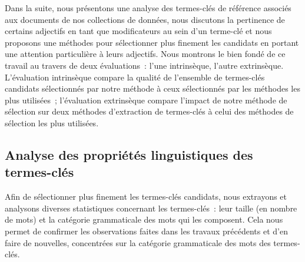     Dans la suite, nous présentons une analyse des termes-clés de référence
    associés aux documents de nos collections de données, nous discutons la
    pertinence de certains adjectifs en tant que modificateurs au sein d'un
    terme-clé et nous proposons une méthodes pour sélectionner plus finement les
    candidats en portant une attention particulière à leurs adjectifs. Nous
    montrons le bien fondé de ce travail au travers de deux évaluations~: l'une
    intrinsèque, l'autre extrinsèque. L'évaluation intrinsèque compare la
    qualité de l'ensemble de termes-clés candidats sélectionnés par notre
    méthode à ceux sélectionnés par les méthodes les plus utilisées~;
    l'évaluation extrinsèque compare l'impact de notre méthode de sélection sur
    deux méthodes d'extraction de termes-clés à celui des méthodes de sélection
    les plus utilisées.

    \subsection{Analyse des propriétés linguistiques des termes-clés}
    \label{subsec:main-automatic_keyphrase_annotation-keyphrase_candidate_selection-analysis_of_keyphrase_properties}
      Afin de sélectionner plus finement les termes-clés candidats, nous
      extrayons et analysons diverses statistiques concernant les termes-clés~:
      leur taille (en nombre de mots) et la catégorie grammaticale des mots qui
      les composent. Cela nous permet de confirmer les observations faites dans
      les travaux précédents et d'en faire de nouvelles, concentrées sur la
      catégorie grammaticale des mots des termes-clés.

